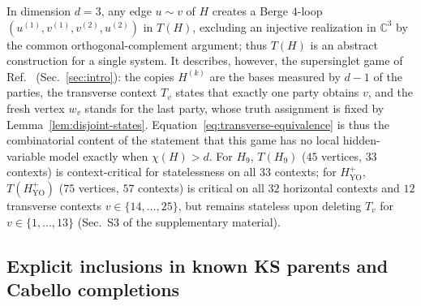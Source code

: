 \documentclass[aps,pra,reprint,superscriptaddress,longbibliography,nofootinbib,floatfix,10pt]{revtex4-2}
\theoremstyle{definition}\newtheorem{definition}[theorem]{Definition}
\theoremstyle{remark}\newtheorem{remark}[theorem]{Remark}
\newcommand{\C}{\mathbb C}\newcommand{\R}{\mathbb R}\newcommand{\Q}{\mathbb Q}
\newcommand{\YO}{\mathrm{YO}}\newcommand{\ip}[2]{\langle #1,#2\rangle}
\begin{document}
In dimension $d=3$, any edge $u\sim v$ of $H$ creates a Berge $4$-loop $(u^{(1)},v^{(1)},v^{(2)},u^{(2)})$ in $T(H)$, excluding an injective realization in $\C^3$ by the common orthogonal-complement argument; thus $T(H)$ is an abstract construction for a single system. It describes, however, the supersinglet game of Ref.~\cite{cabello2012maxnonlocality} (Sec.~\ref{sec:intro}): the copies $H^{(k)}$ are the bases measured by $d-1$ of the parties, the transverse context $T_v$ states that exactly one party obtains $v$, and the fresh vertex $w_v$ stands for the last party, whose truth assignment is fixed by Lemma~\ref{lem:disjoint-states}. Equation~\eqref{eq:transverse-equivalence} is thus the combinatorial content of the statement that this game has no local hidden-variable model exactly when $\chi(H)>d$. For $H_9$, $T(H_9)$ ($45$ vertices, $33$ contexts) is context-critical for statelessness on all $33$ contexts; for $H_{\YO}^{+}$, $T(H_{\YO}^{+})$ ($75$ vertices, $57$ contexts) is critical on all $32$ horizontal contexts and $12$ transverse contexts $v\in\{14,\ldots,25\}$, but remains stateless upon deleting $T_v$ for $v\in\{1,\ldots,13\}$ (Sec.~S3 of the supplementary material).

\subsection{Explicit inclusions in known KS parents and Cabello completions}\label{h:sec:comparison}
\end{document}
